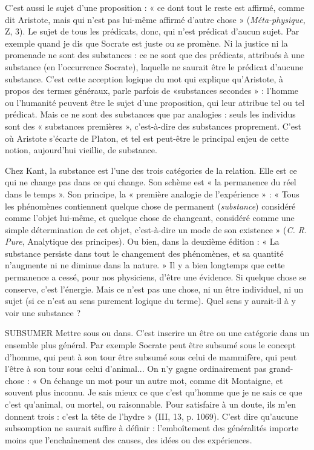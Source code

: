 C’est aussi le sujet d’une proposition : « ce dont tout le reste est affirmé,
comme dit Aristote, mais qui n’est pas lui-même affirmé d’autre chose » ({\it Méta-physique},
Z, 3). Le sujet de tous les prédicats, donc, qui n’est prédicat d’aucun
sujet. Par exemple quand je dis que Socrate est juste ou se promène. Ni la justice
ni la promenade ne sont des substances : ce ne sont que des prédicats, attribués
à une substance (en l’occurrence Socrate), laquelle ne saurait être le prédicat
d'aucune substance. C’est cette acception logique du mot qui explique
qu’Aristote, à propos des termes généraux, parle parfois de «substances
secondes » : l’homme ou l’humanité peuvent être le sujet d’une proposition,
qui leur attribue tel ou tel prédicat. Mais ce ne sont des substances que par
analogies : seuls les individus sont des « substances premières », c’est-à-dire des
substances proprement. C’est où Aristote s’écarte de Platon, et tel est peut-être
le principal enjeu de cette notion, aujourd’hui vieillie, de substance.

Chez Kant, la substance est l’une des trois catégories de la relation. Elle est
ce qui ne change pas dans ce qui change. Son schème est « la permanence du
réel dans le temps ». Son principe, la « première analogie de l'expérience » :
« Tous les phénomènes contiennent quelque chose de permanent ({\it substance})
considéré comme l’objet lui-même, et quelque chose de changeant, considéré
comme une simple détermination de cet objet, c’est-à-dire un mode de son
existence » ({\it C. R. Pure}, Analytique des principes). Ou bien, dans la deuxième
édition : « La substance persiste dans tout le changement des phénomènes, et sa
quantité n’augmente ni ne diminue dans la nature. » Il y a bien longtemps que
cette permanence a cessé, pour nos physiciens, d’être une évidence. Si quelque
chose se conserve, c’est l’énergie. Mais ce n’est pas une chose, ni un être individuel,
ni un sujet (si ce n’est au sens purement logique du terme). Quel sens y
aurait-il à y voir une substance ?

SUBSUMER Mettre sous ou dans. C’est inscrire un être ou une catégorie
dans un ensemble plus général. Par exemple Socrate peut être
subsumé sous le concept d'homme, qui peut à son tour être subsumé sous celui
de mammifère, qui peut l’être à son tour sous celui d’animal... On n’y gagne
ordinairement pas grand-chose : « On échange un mot pour un autre mot,
comme dit Montaigne, et souvent plus inconnu. Je sais mieux ce que c’est
qu’homme que je ne sais ce que c’est qu’animal, ou mortel, ou raisonnable.
Pour satisfaire à un doute, ils m'en donnent trois : c’est la tête de l’hydre »
(III, 13, p. 1069). C’est dire qu'aucune subsomption ne saurait suffire à
définir : l’emboîtement des généralités importe moins que l’enchaînement des
causes, des idées ou des expériences.


